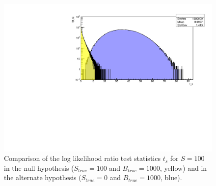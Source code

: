 \documentclass[10pt, oneside]{article}   	%
\begin{document}
\begin{figure}[h]
    \centering
    \includegraphics[width=\textwidth]{Ex3_B1000S100.pdf}
    \caption{Comparison of the log likelihood ratio test statistics $t_s$ for $S=100$ in the null hypothesis ($S_{true}=100$ and $B_{true}=1000$, yellow) and in the alternate hypothesis ($S_{true}=0$ and $B_{true} = 1000$, blue).}
    \label{fig:overlap_B1000S100N1e6}
\end{figure}
\end{document}
